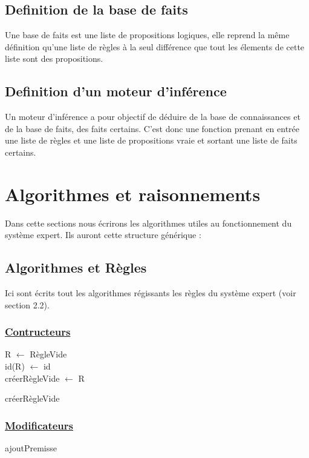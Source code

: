 \documentclass{article}
\begin{document}
\subsection{Definition de la base de faits}
Une base de faits est une liste de propositions logiques, elle reprend la même définition qu'une liste de règles à la seul différence que tout les élements de cette liste sont des propositions.

\subsection{Definition d'un moteur d'inférence}
Un moteur d'inférence a pour objectif de déduire de la base de connaissances et de la base de faits, des faits certains.
C'est donc une fonction prenant en entrée une liste de règles et une liste de propositions vraie et sortant une liste de faits certains.

\section{Algorithmes et raisonnements}
Dans cette sections nous écrirons les algorithmes utiles au fonctionnement du système expert. Ils auront cette structure générique : 

\subsection{Algorithmes et Règles}
Ici sont écrits tout les algorithmes régissants les règles du système expert (voir section 2.2).
\subsubsection{\underline{Contructeurs}}
\begin{algorithm}
    \SetAlgoLined
    R $\longleftarrow$ RègleVide\\
    id(R) $\longleftarrow$ id\\
    créerRègleVide $\longleftarrow$ R 
    \caption{créerRègleVide}
    

\end{algorithm}

\subsubsection{\underline{Modificateurs}}
\begin{algorithm}
    \SetAlgoLined
    
    \caption{ajoutPremisse}
\end{algorithm}
\end{document}
